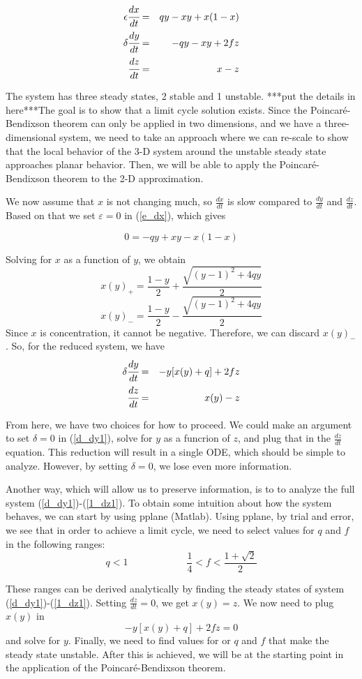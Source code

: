 \documentclass[]{article}
\numberwithin{equation}{section}		%
\def\bea{\begin{eqnarray}}
\def\ena{\end{eqnarray}}
\begin{document}
\bea
\label{e_dx}
\epsilon \cfrac{dx}{dt} & = & qy - xy + x(1-x) \\
\label{d_dy}
\delta \cfrac{dy}{dt} & = & -qy - xy + 2f z \\
\label{1_dz}
\cfrac{dz}{dt} & = & x - z
\ena


\indent The system has three steady states, 2 stable and 1 unstable. ***put the details in here***The goal is to show that a limit cycle solution exists. Since the Poincar\'{e}-Bendixson theorem can only be applied in two dimensions, and we have a three-dimensional system, we need to take an approach where we can re-scale to show that the local behavior of the 3-D system around the unstable steady state approaches planar behavior. Then, we will be able to apply the Poincar\'{e}-Bendixson theorem to the 2-D approximation.

\indent We now assume that $x$ is not changing much, so $\frac{dx}{dt}$ is slow compared to $\frac{dy}{dt}$ and $\frac{dz}{dt}$. Based on that we set $\varepsilon=0$ in (\ref{e_dx}), which gives

$$0= -qy + xy - x(1-x)$$

Solving for $x$ as a function of $y$, we obtain
$$x(y)_{+}=\frac{1-y}{2}+\frac{\sqrt{(y-1)^2+4qy}}{2}$$
$$x(y)_{-}=\frac{1-y}{2}-\frac{\sqrt{(y-1)^2+4qy}}{2}$$
Since $x$ is concentration, it cannot be negative. Therefore, we can discard $x(y)_{-}$.
So, for the reduced system, we have
\bea
\label{d_dy1}
\delta \cfrac{dy}{dt} & = & -y[x(y)+q]+ 2f z \\
\label{1_dz1}
\cfrac{dz}{dt} & = & x(y) - z
\ena

From here, we have two choices for how to proceed. We could make an argument to set $\delta=0$ in (\ref{d_dy1}), solve for $y$ as a funcrion of $z$, and plug that in the $\frac{dz}{dt}$ equation. This reduction will result in a single ODE, which should be simple to analyze. However, by setting $\delta=0$, we lose even more information.

Another way, which will allow us to preserve information, is to to analyze the full system (\ref{d_dy1})-(\ref{1_dz1}). To obtain some intuition about how the system behaves, we can start by using pplane (Matlab). Using pplane, by trial and error, we see that in order to achieve a limit cycle, we need to select values for $q$ and $f$ in the following ranges:
$$q<1\hspace{1in}\frac{1}{4}<f<\frac{1+\sqrt{2}}{2}$$

These ranges can be derived analytically by finding the steady states of system (\ref{d_dy1})-(\ref{1_dz1}). Setting $\frac{dz}{dt}=0$, we get $x(y)=z$. We now need to plug $x(y)$ in 
$$-y[x(y)+q]+ 2f z=0$$
and solve for $y$. Finally, we need to find values for or $q$ and $f$ that make the steady state unstable. After this is achieved, we will be at the starting point in the application of the Poincar\'{e}-Bendixson theorem.
\end{document}
